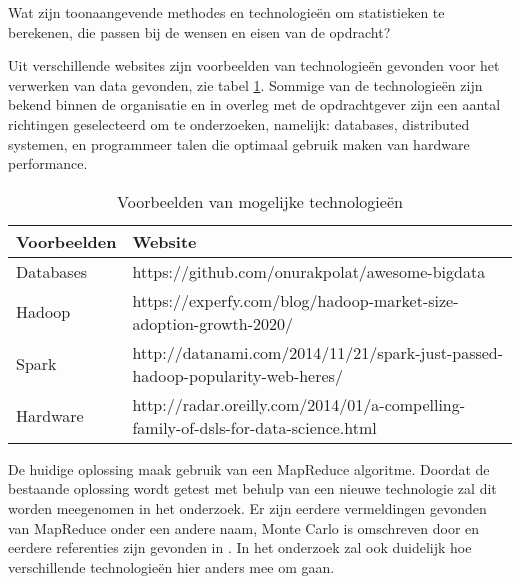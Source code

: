 Wat zijn toonaangevende methodes en technologieën om statistieken te berekenen, die passen bij de wensen en eisen van de opdracht?

Uit verschillende websites zijn voorbeelden van technologieën gevonden voor het verwerken van data gevonden, zie tabel \ref{tab:sites}. Sommige van de technologieën zijn bekend binnen de organisatie en in overleg met de opdrachtgever zijn een aantal richtingen geselecteerd om te onderzoeken, namelijk: databases, distributed systemen, en programmeer talen die optimaal gebruik maken van hardware performance.

\begin{table}[h]
\caption{Voorbeelden van mogelijke technologieën}
\label{tab:sites}
\def\arraystretch{1.5}
\begin{tabular}{|l|p{12.5cm}|}
\hline
\textbf{Voorbeelden} & \textbf{Website}                                                                 \\ \hline
Databases     & https://github.com/onurakpolat/awesome-bigdata                                     \\ \hline
Hadoop                                  & https://experfy.com/blog/hadoop-market-size-adoption-growth-2020/                  \\ \hline
Spark                                   & http://datanami.com/2014/11/21/spark-just-passed-hadoop-popularity-web-heres/      \\ \hline
Hardware                  & http://radar.oreilly.com/2014/01/a-compelling-family-of-dsls-for-data-science.html \\ \hline
\end{tabular}
\end{table}

De huidige oplossing maak gebruik van een MapReduce algoritme. Doordat de bestaande oplossing wordt getest met behulp van een nieuwe technologie zal dit worden meegenomen in het onderzoek. Er zijn eerdere vermeldingen gevonden van MapReduce onder een andere naam, Monte Carlo is omschreven door \textcite{asanovic2006landscape} en eerdere referenties zijn gevonden in \textcite{lee2010debunking}. In het onderzoek zal ook duidelijk hoe verschillende technologieën hier anders mee om gaan.